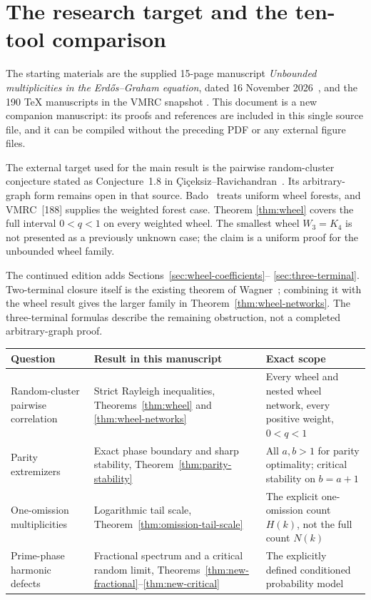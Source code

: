 \documentclass[11pt,a4paper]{article}
\theoremstyle{definition}
\theoremstyle{remark}\newtheorem{remark}[theorem]{Remark}
\begin{document}
\begingroup
\small\setlength{\parskip}{0pt}
\tableofcontents
\endgroup
\clearpage

\section{The research target and the ten-tool comparison}
\label{sec:overview}

The starting materials are the supplied 15-page manuscript
\emph{Unbounded multiplicities in the Erd\H{o}s--Graham equation}, dated
16 November 2026~\cite{Previous}, and the 190 TeX manuscripts in the VMRC snapshot
\cite{VMRC}. This document is a new companion manuscript: its proofs and
references are included in this single source file, and it can be compiled
without the preceding PDF or any external figure files.

The external target used for the main result is the pairwise
random-cluster conjecture stated as Conjecture~1.8 in
\c{C}i\c{c}eksiz--Ravichandran~\cite{CR2026}. Its arbitrary-graph form
remains open in that source. Bado~\cite{Bado2026} treats uniform wheel
forests, and VMRC~[188] supplies the weighted forest case. Theorem
\ref{thm:wheel} covers the full interval $0<q<1$ on every weighted wheel.
The smallest wheel $W_3=K_4$ is not presented as a previously unknown
case; the claim is a uniform proof for the unbounded wheel family.

The continued edition adds Sections~\ref{sec:wheel-coefficients}--
\ref{sec:three-terminal}. Two-terminal closure itself is the existing
theorem of Wagner~\cite{Wagner2008}; combining it with the wheel result
gives the larger family in Theorem~\ref{thm:wheel-networks}. The
three-terminal formulas describe the remaining obstruction, not a
completed arbitrary-graph proof.

\begin{center}
\begin{tabular}{>{\raggedright\arraybackslash}p{}>{\raggedright\arraybackslash}p{}>{\raggedright\arraybackslash}p{}}
\toprule
Question & Result in this manuscript & Exact scope\\
\midrule
Random-cluster pairwise correlation & Strict Rayleigh inequalities,
Theorems~\ref{thm:wheel} and \ref{thm:wheel-networks}
& Every wheel and nested wheel network, every positive weight, $0<q<1$\\
Parity extremizers & Exact phase boundary and sharp stability,
Theorem~\ref{thm:parity-stability} & All $a,b>1$ for parity optimality;
critical stability on $b=a+1$\\
One-omission multiplicities & Logarithmic tail scale,
Theorem~\ref{thm:omission-tail-scale} & The explicit one-omission count
$H(k)$, not the full count $N(k)$\\
Prime-phase harmonic defects & Fractional spectrum and a critical
random limit, Theorems~\ref{thm:new-fractional}--\ref{thm:new-critical}
& The explicitly defined conditioned probability model\\
\bottomrule
\end{tabular}
\end{center}
\end{document}
